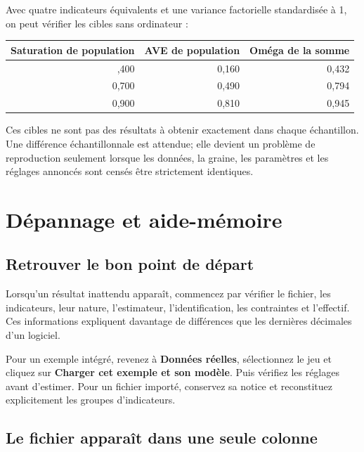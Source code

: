 \documentclass[
  french,
  11pt,
  a4paper,
  DIV=11,
  numbers=noendperiod]{scrreprt}
\newcounter{none} %
\begin{document}
Avec quatre indicateurs équivalents et une variance factorielle
standardisée à 1, on peut vérifier les cibles sans ordinateur :


{\def\LTcaptype{none} %
\begin{longtable}[]{@{}rrr@{}}
\toprule\noalign{}
Saturation de population & AVE de population & Oméga de la somme \\
\midrule\noalign{}
\endhead
\bottomrule\noalign{}
\endlastfoot
0,400 & 0,160 & 0,432 \\
0,700 & 0,490 & 0,794 \\
0,900 & 0,810 & 0,945 \\
\end{longtable}
}

Ces cibles ne sont pas des résultats à obtenir exactement dans chaque
échantillon. Une différence échantillonnale est attendue; elle devient
un problème de reproduction seulement lorsque les données, la graine,
les paramètres et les réglages annoncés sont censés être strictement
identiques.

\chapter{Dépannage et aide-mémoire}\label{sec-depannage}

\section{Retrouver le bon point de
départ}\label{retrouver-le-bon-point-de-duxe9part}

Lorsqu'un résultat inattendu apparaît, commencez par vérifier le
fichier, les indicateurs, leur nature, l'estimateur, l'identification,
les contraintes et l'effectif. Ces informations expliquent davantage de
différences que les dernières décimales d'un logiciel.

Pour un exemple intégré, revenez à \textbf{Données réelles},
sélectionnez le jeu et cliquez sur \textbf{Charger cet exemple et son
modèle}. Puis vérifiez les réglages avant d'estimer. Pour un fichier
importé, conservez sa notice et reconstituez explicitement les groupes
d'indicateurs.

\section{Le fichier apparaît dans une seule
colonne}\label{le-fichier-apparauxeet-dans-une-seule-colonne}
\end{document}
